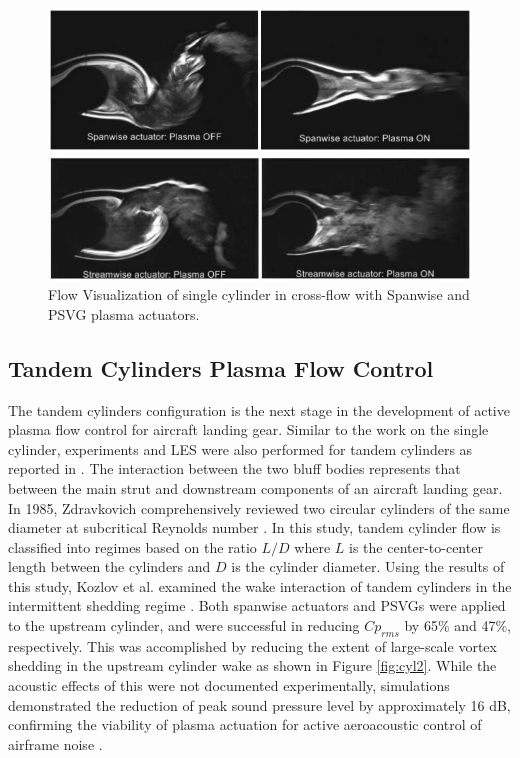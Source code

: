 \begin{figure}
	\begin{center}
		\centerline{\includegraphics[scale=1.0]{figures/single_span.pdf}}
		\centerline{\includegraphics[scale=1.0]{figures/single_psvg.pdf}}
		\caption{Flow Visualization of single cylinder in cross-flow with Spanwise and PSVG plasma actuators.}
		\label{fig:cyl1}
	\end{center}
\end{figure}


\subsection{Tandem Cylinders Plasma Flow Control}

The tandem cylinders configuration is the next stage in the development of active plasma flow control for aircraft landing gear. Similar to the work on the single cylinder, experiments and LES were also performed for tandem cylinders as reported in \cite{eltaweel2014} \cite{khorrami2005} \cite{kozlov20112}. The interaction between the two bluff bodies represents that between the main strut and downstream components of an aircraft landing gear. In 1985, Zdravkovich comprehensively reviewed two circular cylinders of the same diameter at subcritical Reynolds number \cite{zdravkovich1985}. In this study, tandem cylinder flow is classified into regimes based on the ratio $L/D$ where $L$ is the center-to-center length between the cylinders and $D$ is the cylinder diameter. Using the results of this study, Kozlov et al. examined the wake interaction of tandem cylinders in the intermittent shedding regime \cite{kozlov20112}. Both spanwise actuators and PSVGs were applied to the upstream cylinder, and were successful in reducing $Cp_{rms}$ by 65\% and 47\%, respectively. This was accomplished by reducing the extent of large-scale vortex shedding in the upstream cylinder wake as shown in Figure \ref{fig:cyl2}. While the acoustic effects of this were not documented experimentally, simulations demonstrated the reduction of peak sound pressure level by approximately 16 dB, confirming the viability of plasma actuation for active aeroacoustic control of airframe noise \cite{eltaweel2014}. 

